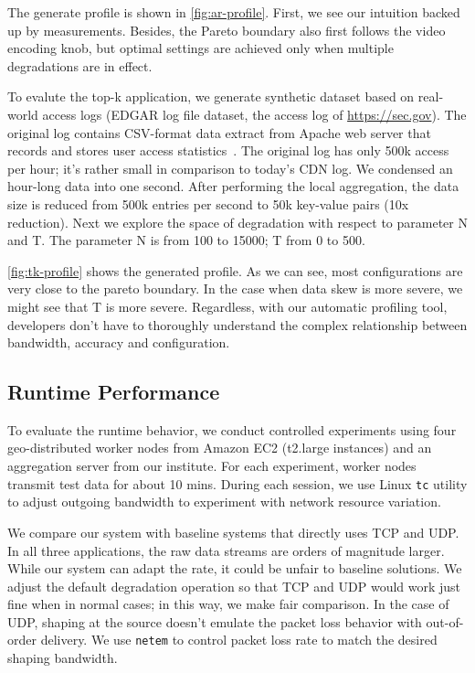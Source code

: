 The generate profile is shown in \autoref{fig:ar-profile}. First, we see our
intuition backed up by measurements. Besides, the Pareto boundary also first
follows the video encoding knob, but optimal settings are achieved only when
multiple degradations are in effect.

 To evalute the top-k application, we generate synthetic dataset
based on real-world access logs (EDGAR log file dataset, the access log of
\url{https://sec.gov}). The original log contains CSV-format data extract from
Apache web server that records and stores user access
statistics~\cite{edgarlog}. The original log has only 500k access per hour; it's
rather small in comparison to today's CDN log. We condensed an hour-long data
into one second. After performing the local aggregation, the data size is
reduced from 500k entries per second to 50k key-value pairs (10x reduction).
Next we explore the space of degradation with respect to parameter N and T.  The
parameter N is from 100 to 15000; T from 0 to 500.

\autoref{fig:tk-profile} shows the generated profile. As we can see, most
configurations are very close to the pareto boundary. In the case when data skew
is more severe, we might see that T is more severe. Regardless, with our
automatic profiling tool, developers don't have to thoroughly understand the
complex relationship between bandwidth, accuracy and configuration.

\subsection{Runtime Performance}
\label{sec:runtime-performance}

To evaluate the runtime behavior, we conduct controlled experiments using four
geo-distributed worker nodes from Amazon EC2 (t2.large instances) and an
aggregation server from our institute. For each experiment, worker nodes
transmit test data for about 10 mins. During each session, we use Linux
\texttt{tc} utility to adjust outgoing bandwidth to experiment with network
resource variation.

We compare our system with baseline systems that directly uses TCP and UDP. In
all three applications, the raw data streams are orders of magnitude
larger. While our system can adapt the rate, it could be unfair to baseline
solutions. We adjust the default degradation operation so that TCP and UDP would
work just fine when in normal cases; in this way, we make fair comparison. In
the case of UDP, shaping at the source doesn't emulate the packet loss behavior
with out-of-order delivery. We use \texttt{netem} to control packet loss rate to
match the desired shaping bandwidth.

